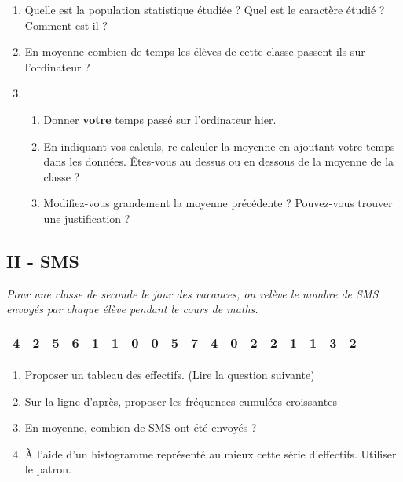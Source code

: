\documentclass[11pt]{article}
\begin{document}
\begin{multicols}{2}
  \begin{enumerate}
  \item[1.] Quelle est la population statistique étudiée ? Quel est le caractère étudié ? Comment est-il ?
  \item[2.] En moyenne combien de temps les élèves de cette classe passent-ils sur l'ordinateur ?
  \item[3.]
    \begin{enumerate}
    \item[a)] Donner \textbf{votre} temps passé sur l'ordinateur hier.
    \item[b)] En indiquant vos calculs, re-calculer la moyenne en ajoutant votre temps dans les données. Êtes-vous au dessus ou en dessous de la moyenne de la classe ?
    \item[c)] Modifiez-vous grandement la moyenne précédente ? Pouvez-vous trouver une justification ?
    \end{enumerate}
  \end{enumerate}
\end{multicols}

\subsection*{II - SMS}

\textit{Pour une classe de seconde le jour des vacances, on relève le nombre de SMS envoyés par chaque élève pendant le cours de maths.}

\begin{center}
  \begin{tabular}{| c | c | c | c | c | c | c | c | c | c | c | c | c | c | c | c | c | c | }
    \hline
    4 & 2 & 5 & 6 & 1 & 1 & 0 & 0 & 5 & 7 & 4 & 0 & 2 & 2 & 1 & 1 & 3 & 2 \\
    \hline
  \end{tabular}
\end{center}

\begin{multicols}{2}
  \begin{enumerate}
  \item[1.] Proposer un tableau des effectifs. (Lire la question suivante)
  \item[2.] Sur la ligne d'après, proposer les fréquences cumulées croissantes
  \item[3.] En moyenne, combien de SMS ont été envoyés ? 
  \item[4.] À l'aide d'un histogramme représenté au mieux cette série d'effectifs. Utiliser le patron.
  \end{enumerate}
\end{multicols}
\end{document}
